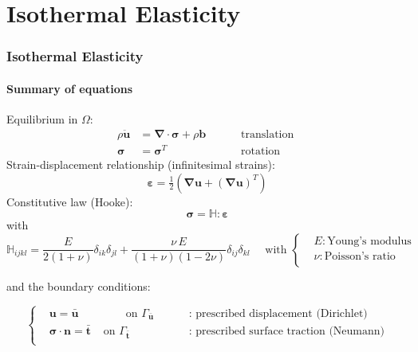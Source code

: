 \documentclass[10pt,xcolor=pdftex,dvipsnames,table]{beamer}
\begin{document}
\section{ Isothermal Elasticity  }
\begin{frame}
	\frametitle{ Isothermal Elasticity }
	\framesubtitle{ Summary of equations }
	
	Equilibrium in $\Omega$:
	\begin{equation*}
		\begin{aligned}
		 \rho \ddot{\boldsymbol{u}} &= \boldsymbol{\nabla}\cdot\boldsymbol{\sigma} + \rho\boldsymbol{b} 
		\qquad &\text{ translation } \\
		 \boldsymbol{\sigma} &= \boldsymbol{\sigma}^T &\text{ rotation }
		\end{aligned}
	\end{equation*}
	Strain-displacement relationship (infinitesimal strains):
	\begin{equation*}
		\boldsymbol{\varepsilon} 
		= \tfrac{1}{2} \left( \boldsymbol{\nabla}\boldsymbol{u} + (\boldsymbol{\nabla}\boldsymbol{u})^T \right) 
	\end{equation*}
	Constitutive law (Hooke):
	\begin{equation*}
		\boldsymbol{\sigma} = \mathbb{H}:\boldsymbol{\varepsilon}
	\end{equation*}
	with
	\begin{equation*}
		\mathbb{H}_{ijkl} = \frac{E}{2(1+\nu)} \delta_{ik}\delta_{jl}
		+ \frac{\nu\,E}{(1+\nu)(1-2\nu)}\delta_{ij}\delta_{kl}
				\quad\text{ with }
		\left\{
		\begin{aligned}
			&E : \text{Young's modulus} \\
			&\nu : \text{Poisson's ratio} \\
		\end{aligned}
		\right.
	\end{equation*}	
	
	and the boundary conditions:
	
		\begin{equation*}
		\left\{
		\begin{aligned}
			&  \boldsymbol{u} = \bar{\boldsymbol{u}}     & \qquad \text { on } \Gamma_{\bar{\boldsymbol{u}}} & \qquad \text{ : prescribed displacement (Dirichlet)} \\
			&  \boldsymbol{\sigma}\cdot\boldsymbol{n}  = \bar{\boldsymbol{t}}     & \text { on } \Gamma_{\bar{\boldsymbol{t}}} & \qquad \text{ : prescribed surface traction (Neumann)} \\
		\end{aligned}
		\right.    
	\end{equation*}	
	
\end{frame}
\end{document}
